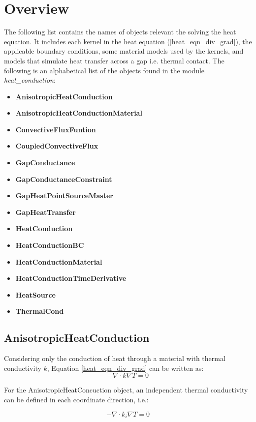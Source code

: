 \documentclass[preprint,5p]{elsarticle}
\begin{document}
\section{Overview}
The following list contains the names of objects relevant the solving the heat equation. It includes each kernel in the heat equation (\ref{heat_eqn_div_grad}), the applicable boundary conditions, some material models used by the kernels, and models that simulate heat transfer across a gap i.e. thermal contact. The following is an alphabetical list of the objects found in the module \textit{heat\_conduction}:
\begin{itemize}
\item \textbf{AnisotropicHeatConduction}
\item \textbf{AnisotropicHeatConductionMaterial}
\item \textbf{ConvectiveFluxFuntion}
\item \textbf{CoupledConvectiveFlux}
\item \textbf{GapConductance}
\item \textbf{GapConductanceConstraint}
\item \textbf{GapHeatPointSourceMaster}
\item \textbf{GapHeatTransfer}
\item \textbf{HeatConduction}
\item \textbf{HeatConductionBC}
\item \textbf{HeatConductionMaterial}
\item \textbf{HeatConductionTimeDerivative}
\item \textbf{HeatSource}
\item \textbf{ThermalCond}
\end{itemize}

\subsection{AnisotropicHeatConduction}
Considering only the conduction of heat through a material with thermal conductivity $k$, Equation \ref{heat_eqn_div_grad} can be written as:
\begin{equation}
\label{just_conduction}
- \nabla \cdot  k\nabla T = 0
\end{equation}

For the AnisotropicHeatConcuction object, an independent thermal conductivity can be defined in each coordinate direction, i.e.:

\begin{equation}
\label{just_conduction_aniso}
- \nabla \cdot  k_i\nabla T = 0
\end{equation}
\end{document}
